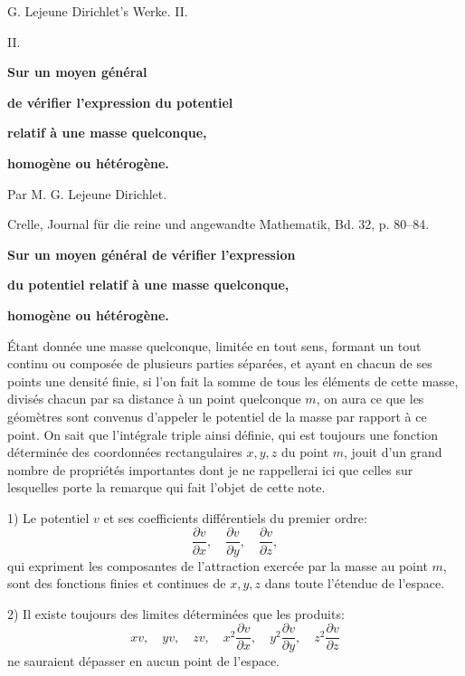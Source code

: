 \documentclass[11pt]{article}
\begin{document}
\begin{center}
{\Large G. Lejeune Dirichlet's Werke. II.}\par\vspace{1.5em}
{\Large II.}\par\vspace{0.5em}
{\LARGE \textbf{Sur un moyen général}}\par
{\LARGE \textbf{de vérifier l'expression du potentiel}}\par
{\LARGE \textbf{relatif à une masse quelconque,}}\par
{\LARGE \textbf{homogène ou hétérogène.}}\par\vspace{1em}
{\large Par M. G. Lejeune Dirichlet.}\par\vspace{0.5em}
{\small Crelle, Journal für die reine und angewandte Mathematik, Bd. 32, p. 80--84.}
\end{center}

\begin{center}
\textbf{Sur un moyen général de vérifier l'expression}\par
\textbf{du potentiel relatif à une masse quelconque,}\par
\textbf{homogène ou hétérogène.}
\end{center}

Étant donnée une masse quelconque, limitée en tout sens, formant un tout continu ou composée de plusieurs parties séparées, et ayant en chacun de ses points une densité finie, si l'on fait la somme de tous les éléments de cette masse, divisés chacun par sa distance à un point quelconque $m$, on aura ce que les géomètres sont convenus d'appeler le potentiel de la masse par rapport à ce point. On sait que l'intégrale triple ainsi définie, qui est toujours une fonction déterminée des coordonnées rectangulaires $x,y,z$ du point $m$, jouit d'un grand nombre de propriétés importantes dont je ne rappellerai ici que celles sur lesquelles porte la remarque qui fait l'objet de cette note.

1) Le potentiel $v$ et ses coefficients différentiels du premier ordre:
\[
\frac{\partial v}{\partial x},\quad \frac{\partial v}{\partial y},\quad \frac{\partial v}{\partial z},
\]
qui expriment les composantes de l'attraction exercée par la masse au point $m$, sont des fonctions finies et continues de $x,y,z$ dans toute l'étendue de l'espace.

2) Il existe toujours des limites déterminées que les produits:
\[
 xv,\quad yv,\quad zv,\quad x^2\frac{\partial v}{\partial x},\quad y^2\frac{\partial v}{\partial y},\quad z^2\frac{\partial v}{\partial z}
\]
ne sauraient dépasser en aucun point de l'espace.
\end{document}
